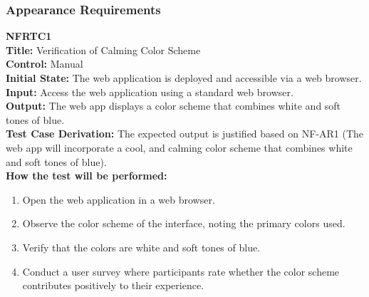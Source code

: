 \documentclass[12pt, titlepage]{article}
\begin{document}
\subsubsection{Appearance Requirements}
\textbf{NFRTC1}\\
\textbf{Title:} Verification of Calming Color Scheme\\
\textbf{Control:} Manual\\
\textbf{Initial State:} The web application is deployed and accessible via a web browser.\\
\textbf{Input:} Access the web application using a standard web browser.\\
\textbf{Output:} The web app displays a color scheme that combines white and soft tones of blue.\\
\textbf{Test Case Derivation:} The expected output is justified based on NF-AR1 (The web app will incorporate a cool, and calming color scheme that combines white and soft tones of blue).\\
\textbf{How the test will be performed:}
\begin{enumerate}
  \item Open the web application in a web browser.
  \item Observe the color scheme of the interface, noting the primary colors used.
  \item Verify that the colors are white and soft tones of blue.
  \item Conduct a user survey where participants rate whether the color scheme contributes positively to their experience.
\end{enumerate}
\vspace{1em}
\end{document}
